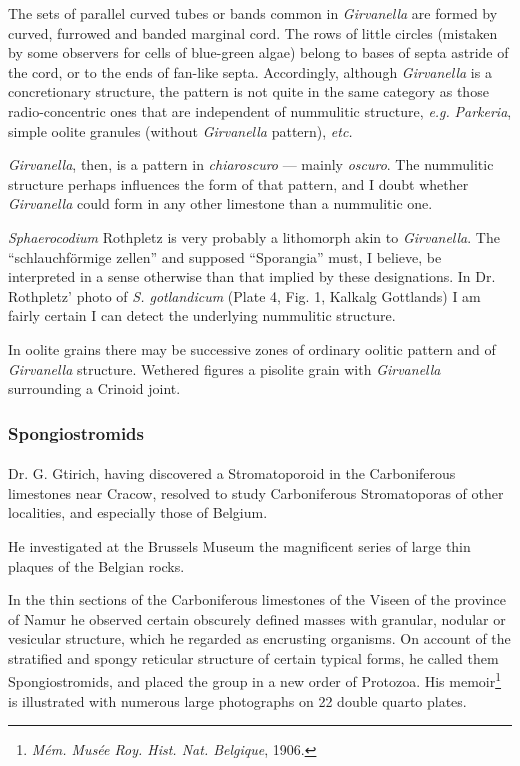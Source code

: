 \documentclass[a4paper, 12pt, oneside]{article}
\begin{document}
The sets of parallel curved tubes or bands common in \emph{Girvanella} are formed by curved, furrowed and banded marginal cord. The rows of little circles (mistaken by some observers for cells of blue-green algae) belong to bases of septa astride of the cord, or to the ends of fan-like septa. Accordingly, although \emph{Girvanella} is a concretionary structure, the pattern is not quite in the same category as those radio-concentric ones that are independent of nummulitic structure, \emph{e.g.} \emph{Parkeria}, simple oolite granules (without \emph{Girvanella} pattern), \emph{etc.}

\emph{Girvanella}, then, is a pattern in \emph{chiaroscuro} --- mainly \emph{oscuro}. The nummulitic structure perhaps influences the form of that pattern, and I doubt whether \emph{Girvanella} could form in any other limestone than a nummulitic one.

\emph{Sphaerocodium} Rothpletz is very probably a lithomorph akin to \emph{Girvanella}. The ``schlauchförmige zellen'' and supposed ``Sporangia'' must, I believe, be interpreted in a sense otherwise than that implied by these designations. In Dr. Rothpletz' photo of \emph{S. gotlandicum} (Plate 4, Fig. 1, Kalkalg Gottlands) I am fairly certain I can detect the underlying nummulitic structure.

In oolite grains there may be successive zones of ordinary oolitic pattern and of \emph{Girvanella} structure. Wethered figures a pisolite grain with \emph{Girvanella} surrounding a Crinoid joint.

\subsubsection{Spongiostromids}
\paragraph{}
Dr. G. Gtirich, having discovered a Stromatoporoid in the Carboniferous limestones near Cracow, resolved to study Carboniferous Stromatoporas of other localities, and especially those of Belgium.

He investigated at the Brussels Museum the magnificent series of large thin plaques of the Belgian rocks.

In the thin sections of the Carboniferous limestones of the Viseen of the province of Namur he observed certain obscurely defined masses with granular, nodular or vesicular structure, which he regarded as encrusting organisms. On account of the stratified and spongy reticular structure of certain typical forms, he called them Spongiostromids, and placed the group in a new order of Protozoa. His memoir\footnote{\emph{Mém. Musée Roy. Hist. Nat. Belgique}, 1906.} is illustrated with numerous large photographs on 22 double quarto plates.
\end{document}
